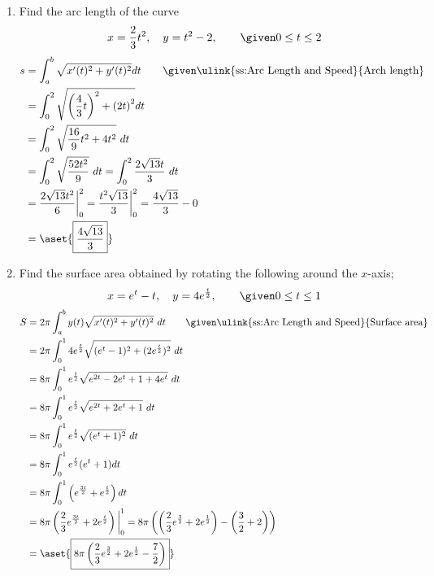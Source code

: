 \begin{enumerate}
  \vspace{3em}
  \item Find the arc length of the curve
    \[%
      x = \frac{2}{3}t^2, \quad y = t^2 - 2, \qquad \given 0 \leq t \leq 2
    \]%
    \begin{align*}
      s &= \int_{a}^{b} \sqrt{x'(t)^2 + y'(t)^2} dt \qquad \given
      \text{\ulink{ss:Arc Length and Speed}{Arch length} }\\
        &= \int_{0}^{2} \sqrt{\left(\frac{4}{3}t\right)^2 + \left( 2t \right) ^2} dt \\
        &= \int_{0}^{2} \sqrt{\frac{16}{9}t^2 +  4t^2} ~dt \\
        &= \int_{0}^{2} \sqrt{\frac{52t^2}{9}} ~dt
         = \int_{0}^{2} \frac{2\sqrt{13}t}{3} ~dt \\
        &= \frac{2\sqrt{13}t^2}{6} \bigg|_{0}^{2}
         = \frac{t^2\sqrt{13}}{3} \bigg|_{0}^{2}
         = \frac{4\sqrt{13}}{3} - 0 \\
        &= \aset{\boxed{\frac{4\sqrt{13}}{3}}}
    \end{align*}


\newpage %

  \item Find the surface area obtained by rotating the following around the
    \(x\)-axis;
    \[%
    x = e^t - t, \quad y = 4e^{\frac{t}{2}}, \qquad \given 0 \leq t \leq 1
    \]%
    \begin{align*}
      S &= 2\pi \int_{a}^{b} y(t) \sqrt{x'(t)^2 + y'(t)^2}~dt
      \qquad \given  \text{\ulink{ss:Arc Length and Speed}{Surface area}} \\
        &= 2\pi \int_{0}^{1} 4e^{\frac{t}{2}} \sqrt{(e^t - 1)^2 + (2e^{\frac{t}{2}})^2}~dt \\
        &= 8\pi \int_{0}^{1} e^{\frac{t}{2}} \sqrt{e^{2t} - 2e^t + 1 + 4e^t}~dt\\
        &= 8\pi \int_{0}^{1} e^{\frac{t}{2}} \sqrt{e^{2t} + 2e^t + 1}~dt \\
        &= 8\pi \int_{0}^{1} e^{\frac{t}{2}} \sqrt{(e^t + 1)^2}~dt \\
        &= 8\pi \int_{0}^{1} e^{\frac{t}{2}} (e^t + 1) dt \\
        &= 8\pi \int_{0}^{1} \left(e^{\frac{3t}{2}}  + e^{\frac{t}{2}}\right)  dt \\
        &= 8\pi \left(\frac{2}{3}e^{\frac{3t}{2}}  + 2e^{\frac{t}{2}}\right) \bigg|_{0}^{1}
        = 8\pi \left(\left(\frac{2}{3}e^{\frac{3}{2}}  + 2e^{\frac{1}{2}}\right) - \left(\frac{3}{2} + 2\right)\right) \\
        &= \aset{\boxed{8\pi \left(\frac{2}{3}e^{\frac{3}{2}}  + 2e^{\frac{1}{2}} - \frac{7}{2}\right)}} \\
    \end{align*}



\end{enumerate}
